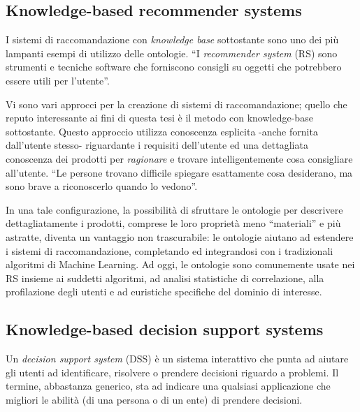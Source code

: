\subsection{Knowledge-based recommender systems}
I sistemi di raccomandazione con \textit{knowledge base} sottostante sono uno dei più lampanti esempi di utilizzo delle ontologie. ``I \textit{recommender system} (RS) sono strumenti e tecniche software che forniscono consigli su oggetti che potrebbero essere utili per l'utente''\cite{recsyshandbook}. 

Vi sono vari approcci per la creazione di sistemi di raccomandazione; quello che reputo interessante ai fini di questa tesi è il metodo con knowledge-base sottostante. Questo approccio utilizza conoscenza esplicita -anche fornita dall'utente stesso- riguardante i requisiti dell'utente ed una dettagliata conoscenza dei prodotti per \textit{ragionare} e trovare intelligentemente cosa consigliare all'utente. ``Le persone trovano difficile spiegare esattamente cosa desiderano, ma sono brave a riconoscerlo quando lo vedono''\cite{ontologyhandbook}.

In una tale configurazione, la possibilità di sfruttare le ontologie per descrivere dettagliatamente i prodotti, comprese le loro proprietà meno ``materiali'' e più astratte, diventa un vantaggio non trascurabile: le ontologie aiutano ad estendere i sistemi di raccomandazione, completando ed integrandosi con i tradizionali algoritmi di Machine Learning. Ad oggi, le ontologie sono comunemente usate nei RS insieme ai suddetti algoritmi, ad analisi statistiche di correlazione, alla profilazione degli utenti e ad euristiche specifiche del dominio di interesse\cite{ontologyhandbook}.



\subsection{Knowledge-based decision support systems}
Un \textit{decision support system} (DSS) è un sistema interattivo che punta ad aiutare gli utenti ad identificare, risolvere o prendere decisioni riguardo a problemi.
Il termine, abbastanza generico, sta ad indicare una qualsiasi applicazione che migliori le abilità (di una persona o di un ente) di prendere decisioni\cite{dss}.

